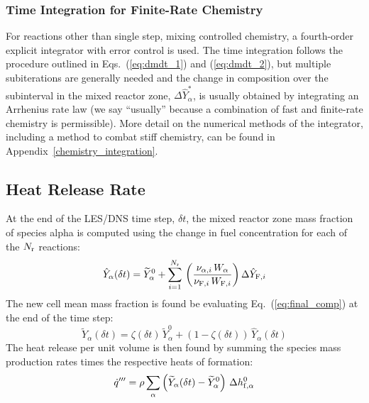 \subsubsection{Time Integration for Finite-Rate Chemistry}

For reactions other than single step, mixing controlled chemistry, a fourth-order explicit integrator with error control is used. The time integration follows the procedure outlined in Eqs.~(\ref{eq:dmdt_1}) and (\ref{eq:dmdt_2}), but multiple subiterations are generally needed and the change in composition over the subinterval in the mixed reactor zone, $\Delta \hat{Y}_\alpha^*$, is usually obtained by integrating an Arrhenius rate law (we say ``usually'' because a combination of fast and finite-rate chemistry is permissible). More detail on the numerical methods of the integrator, including a method to combat stiff chemistry, can be found in Appendix~\ref{chemistry_integration}.


\subsection{Heat Release Rate}
\label{sec:hrr}

At the end of the LES/DNS time step, $\delta t$, the mixed reactor zone mass fraction of species alpha is computed using the change in fuel concentration for each of the $N_{\rm r}$ reactions:
\begin{equation}\label{eq:change_alpha}
\hat{Y}_\alpha(\delta t) = \widetilde{Y}_\alpha^0 + \sum_{i=1}^{N_{\rm r}} \,\left(\frac{\nu_{\alpha,i} \,W_{\alpha}}{\nu_{{\rm F},i} \,W_{{\rm F},i}}\right)\Delta \hat{Y}_{{\rm F},i}
\end{equation}
The new cell mean mass fraction is found be evaluating Eq.~(\ref{eq:final_comp}) at the end of the time step:
\begin{equation}
\label{eq:final_comp2}
\widetilde{Y}_{\alpha}(\delta t)= \zeta(\delta t) \, \widetilde{Y}_{\alpha}^0 + (1-\zeta(\delta t)) \, \hat{Y}_{\alpha}(\delta t)
\end{equation}
The heat release per unit volume is then found by summing the species mass production rates times the respective heats of formation:
\begin{equation}\label{eq:vol_heat_gen}
\dot{q}''' = \rho  \sum_{\alpha} \left( \widetilde{Y}_{\alpha}(\delta t)-\widetilde{Y}_{\alpha}^0 \right) \, \Delta h_{{\rm f},\alpha}^0
\end{equation}




